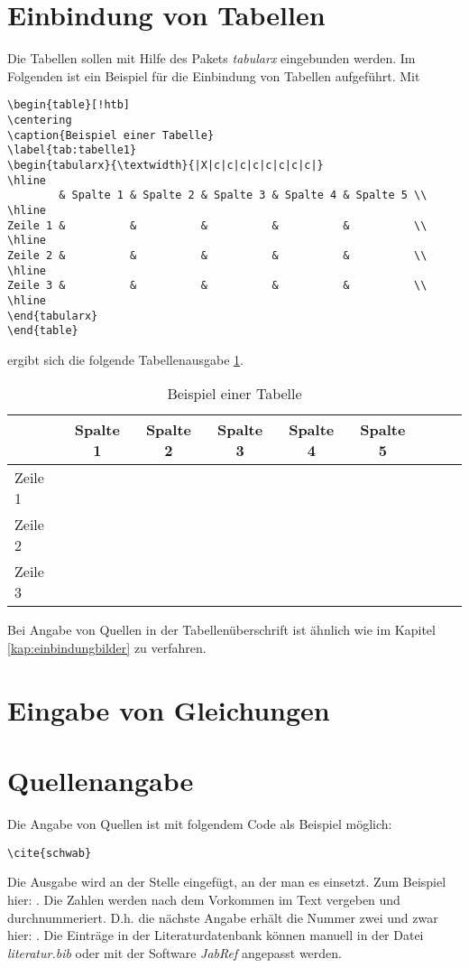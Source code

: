 \section{Einbindung von Tabellen}
\label{kap:einbindungtabellen}
Die Tabellen sollen mit Hilfe des Pakets \textit{tabularx} eingebunden werden. Im Folgenden ist ein Beispiel für die Einbindung von Tabellen aufgeführt. Mit
\begin{verbatim}
\begin{table}[!htb]
\centering
\caption{Beispiel einer Tabelle}
\label{tab:tabelle1}
\begin{tabularx}{\textwidth}{|X|c|c|c|c|c|c|c|c|}
\hline
        & Spalte 1 & Spalte 2 & Spalte 3 & Spalte 4 & Spalte 5 \\
\hline
Zeile 1 &          &          &          &          &          \\
\hline
Zeile 2 &          &          &          &          &          \\
\hline
Zeile 3 &          &          &          &          &          \\
\hline
\end{tabularx}
\end{table}
\end{verbatim}
ergibt sich die folgende Tabellenausgabe \ref{tab:tabelle1}.
\begin{table}[!htb]
\centering
\caption{Beispiel einer Tabelle}
\label{tab:tabelle1}
\begin{tabularx}{\textwidth}{|X|c|c|c|c|c|c|c|c|}
\hline
 				& Spalte 1 	& Spalte 2 	& Spalte 3 	& Spalte 4 	& Spalte 5 \\
\hline
Zeile 1 & 					& 					& 					& 					& \\
\hline
Zeile 2 & 					& 					& 					& 					& \\
\hline
Zeile 3 & 					& 					& 					& 					& \\
\hline
\end{tabularx}
\end{table}
Bei Angabe von Quellen in der Tabellenüberschrift ist ähnlich wie im Kapitel \ref{kap:einbindungbilder} zu verfahren.

\section{Eingabe von Gleichungen}
\label{kap:einbindunggleichungen}


\section{Quellenangabe}
\label{kap:quellenangabe}
Die Angabe von Quellen ist mit folgendem Code als Beispiel möglich:
\begin{verbatim}
\cite{schwab}
\end{verbatim}
Die Ausgabe wird an der Stelle eingefügt, an der man es einsetzt. Zum Beispiel hier: \cite{schwab}. Die Zahlen werden nach dem Vorkommen im Text vergeben und durchnummeriert. D.h. die nächste Angabe erhält die Nummer zwei und zwar hier: \cite{oedingoswald}. Die Einträge in der Literaturdatenbank können manuell in der Datei \textit{literatur.bib} oder mit der Software \textit{JabRef} angepasst werden.